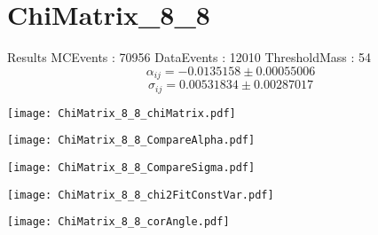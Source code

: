 \documentclass[a4paper,12pt]{article}
\begin{document}
\section{ChiMatrix\_8\_8}
\begin{minipage}{0.49\linewidth} Results \newline
MCEvents : 70956\newline
DataEvents : 12010 \newline
ThresholdMass : 54\\
$$\alpha_{ij} = -0.0135158\pm 0.00055006$$
$$\sigma_{ij} = 0.00531834\pm 0.00287017$$
\end{minipage}\hfill
\begin{minipage}{0.49\linewidth} 
\texttt{[image: ChiMatrix\_8\_8\_chiMatrix.pdf]}\\
\end{minipage}
\hfill
\begin{minipage}{0.49\linewidth} 
\texttt{[image: ChiMatrix\_8\_8\_CompareAlpha.pdf]}\\
\end{minipage}
\hfill
\begin{minipage}{0.49\linewidth} 
\texttt{[image: ChiMatrix\_8\_8\_CompareSigma.pdf]}\\
\end{minipage}
\begin{minipage}{0.49\linewidth} 
\texttt{[image: ChiMatrix\_8\_8\_chi2FitConstVar.pdf]}\\
\end{minipage}
\hfill
\begin{minipage}{0.49\linewidth} 
\texttt{[image: ChiMatrix\_8\_8\_corAngle.pdf]}\\
\end{minipage}
\end{document}

